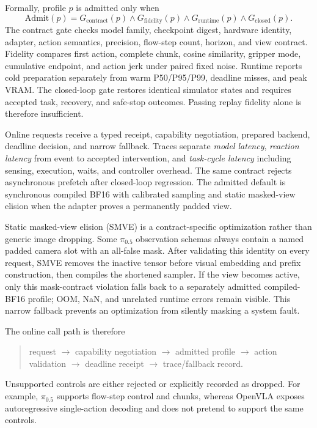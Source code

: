 \documentclass[runningheads]{waica}
\newcommand{\pizero}{$\pi_{0.5}$}
\begin{document}
Formally, profile $p$ is admitted only when
\begin{equation}
\mathrm{Admit}(p)=G_{\mathrm{contract}}(p)\wedge
G_{\mathrm{fidelity}}(p)\wedge G_{\mathrm{runtime}}(p)\wedge
G_{\mathrm{closed}}(p).
\label{eq:admission}
\end{equation}
The contract gate checks model family, checkpoint digest, hardware identity,
adapter, action semantics, precision, flow-step count, horizon, and view
contract. Fidelity compares first action, complete chunk, cosine similarity,
gripper mode, cumulative endpoint, and action jerk under paired fixed noise.
Runtime reports cold preparation separately from warm P50/P95/P99, deadline
misses, and peak VRAM. The closed-loop gate restores identical simulator states
and requires accepted task, recovery, and safe-stop outcomes. Passing replay
fidelity alone is therefore insufficient.

Online requests receive a typed receipt, capability negotiation, prepared
backend, deadline decision, and narrow fallback. Traces separate \emph{model
latency}, \emph{reaction latency} from event to accepted intervention, and
\emph{task-cycle latency} including sensing, execution, waits, and controller
overhead. The same contract rejects asynchronous prefetch after closed-loop
regression. The admitted default is synchronous compiled BF16 with calibrated
sampling and static masked-view elision when the adapter proves a permanently
padded view.

Static masked-view elision (SMVE) is a contract-specific optimization rather
than generic image dropping. Some \pizero{} observation schemas always contain
a named padded camera slot with an all-false mask. After validating this
identity on every request, SMVE removes the inactive tensor before visual
embedding and prefix construction, then compiles the shortened sampler. If the
view becomes active, only this mask-contract violation falls back to a
separately admitted compiled-BF16 profile; OOM, NaN, and unrelated runtime
errors remain visible. This narrow fallback prevents an optimization from
silently masking a system fault.

The online call path is therefore
\begin{quote}
request $\rightarrow$ capability negotiation $\rightarrow$ admitted profile
$\rightarrow$ action validation $\rightarrow$ deadline receipt $\rightarrow$
trace/fallback record.
\end{quote}
Unsupported controls are either rejected or explicitly recorded as dropped.
For example, \pizero{} supports flow-step control and chunks, whereas OpenVLA
exposes autoregressive single-action decoding and does not pretend to support
the same controls.
\end{document}
